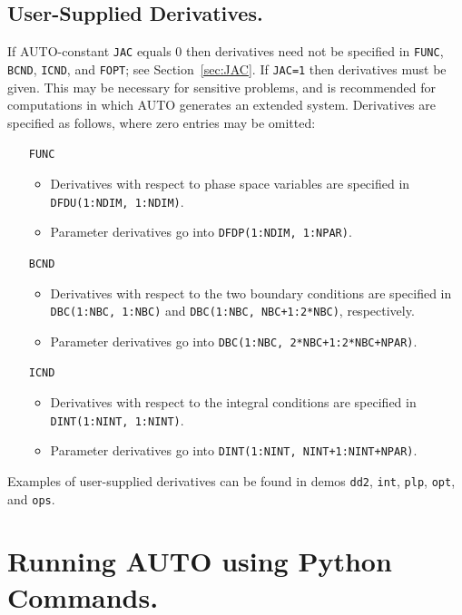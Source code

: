 \documentclass[12pt]{report}
\begin{document}
\section{ User-Supplied Derivatives.} \label{sec:derivatives}
If {\cal AUTO}-constant {\tt JAC} equals 0 
then derivatives need not be specified in 
{\tt FUNC}, {\tt BCND}, {\tt ICND}, and {\tt FOPT}; see Section~\ref{sec:JAC}.
If {\tt JAC=1} then derivatives must be given.
This may be necessary for sensitive 
problems, and is recommended for computations in which {\cal AUTO} 
generates an extended system.
Derivatives are specified as follows, where zero entries may be
omitted:
\begin{itemize}
\item[{\tt FUNC}]
\begin{itemize}
\item
 Derivatives with respect to phase space variables
  are specified in {\tt DFDU(1:NDIM, 1:NDIM)}.
\item
 Parameter derivatives go into {\tt DFDP(1:NDIM, 1:NPAR)}.
\end{itemize}
\item[{\tt BCND}]
\begin{itemize}
\item
Derivatives with respect to the two boundary conditions
are specified in {\tt DBC(1:NBC, 1:NBC)} and {\tt DBC(1:NBC, NBC+1:2*NBC)},
respectively.
\item
Parameter derivatives go into {\tt DBC(1:NBC, 2*NBC+1:2*NBC+NPAR)}.
\end{itemize}
\item[{\tt ICND}]
\begin{itemize}
\item
Derivatives with respect to the integral conditions
are specified in {\tt DINT(1:NINT, 1:NINT)}.
\item
Parameter derivatives go into {\tt DINT(1:NINT, NINT+1:NINT+NPAR)}.
\end{itemize}
\end{itemize}
Examples of user-supplied derivatives can be found in
demos  {\tt dd2}, {\tt int}, {\tt plp}, {\tt opt}, and {\tt ops}.

\chapter{ Running {\cal AUTO} using Python Commands.} \label{ch:python_mode}
\end{document}
